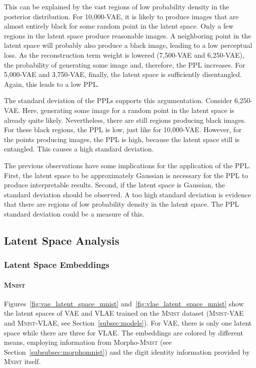 This can be explained by the vast regions of low probability density in the posterior distribution.
For 10,000-\ac{VAE}, it is likely to produce images that are almost entirely black for some random point in the latent space.
Only a few regions in the latent space produce reasonable images.
A neighboring point in the latent space will probably also produce a black image, leading to a low perceptual loss.
As the reconstruction term weight is lowered (7,500-\ac{VAE} and 6,250-\ac{VAE}), the probability of generating some image and, therefore, the \ac{PPL} increases.
For 5,000-\ac{VAE} and 3,750-\ac{VAE}, finally, the latent space is sufficiently disentangled.
Again, this leads to a low \ac{PPL}.

The standard deviation of the \acp{PPL} supports this argumentation.
Consider 6,250-\ac{VAE}.
Here, generating some image for a random point in the latent space is already quite likely.
Nevertheless, there are still  regions producing black images.
For these black regions, the \ac{PPL} is low, just like for 10,000-\ac{VAE}.
However, for the points producing images, the \ac{PPL} is high, because the latent space still is entangled.
This causes a high standard deviation.

The previous observations have some implications for the application of the \ac{PPL}.
First, the latent space to be approximately Gaussian is necessary for the \ac{PPL} to produce interpretable results.
Second, if the latent space is Gaussian, the standard deviation should be observed.
A too high standard deviation is evidence that there are regions of low probability density in the latent space.
The \ac{PPL} standard deviation could be a measure of this.

\subsection{Latent Space Analysis}\label{subsec:model-generated-samples}

\subsubsection{Latent Space Embeddings}\label{subsubsec:latent_space_embeddings}

\paragraph{\textsc{Mnist}}

Figures~\ref{fig:vae_latent_space_mnist} and~\ref{fig:vlae_latent_space_mnist} show the latent spaces of \ac{VAE} and \ac{VLAE} trained on the \textsc{Mnist} dataset (\textsc{Mnist}-\ac{VAE} and \textsc{Mnist}-\ac{VLAE}, see Section~\ref{subsec:models}).
For \ac{VAE}, there is only one latent space while there are three for \ac{VLAE}.
The embeddings are colored by different means, employing information from Morpho-\textsc{Mnist} (see Section~\ref{subsubsec:morphomnist}) and the digit identity information provided by \textsc{Mnist} itself.

